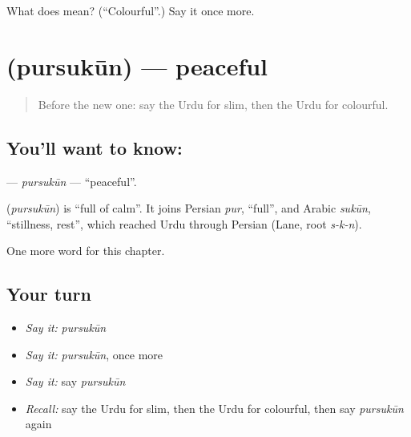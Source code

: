 \begin{tcolorbox}[breakable,colback=teal!4,colframe=teal!35!black,title={Before you move on}]
What does  mean? (\textquotedblleft{}Colourful\textquotedblright{}.) Say it once more.
\end{tcolorbox}
\section[\texorpdfstring{\ur{پرسکون} (pursukūn)}{پرسکون (pursukūn)}]{ (pursukūn) — peaceful}

\label{lesson:UR-C249-pursukun}



\begin{quote}
Before the new one: say the Urdu for slim, then the Urdu for colourful.
\end{quote}

\subsection*{You'll want to know: }
\textbf{} — \emph{pursukūn} — \textquotedblleft{}peaceful\textquotedblright{}.

\begin{cousinweb}
\textbf{} (\emph{pursukūn}) is \textquotedblleft{}full of calm\textquotedblright{}. It joins Persian \emph{pur}, \textquotedblleft{}full\textquotedblright{}, and Arabic \emph{sukūn}, \textquotedblleft{}stillness, rest\textquotedblright{}, which reached Urdu through Persian (Lane, root \emph{s-k-n}).
\end{cousinweb}

\begin{grammarlens}[title={What you've built}]
One more word for this chapter.
\end{grammarlens}

\subsection*{Your turn}
\begin{itemize}
\raggedright
  \item \emph{Say it:} \emph{pursukūn}
  \item \emph{Say it:} \emph{pursukūn}, once more
  \item \emph{Say it:} say \emph{pursukūn}
  \item \emph{Recall:} say the Urdu for slim, then the Urdu for colourful, then say \emph{pursukūn} again
\end{itemize}

